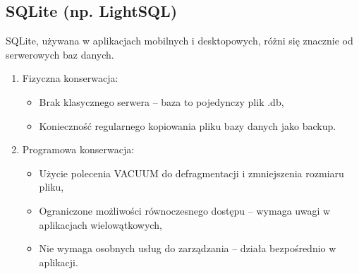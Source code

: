 \documentclass[a4paper,11pt,polish]{sphinxmanual}
\begin{document}
\subsection{SQLite (np. LightSQL)}
\label{\detokenize{Kontrola_i_konserwacja/kontrola_i_konserwacja:sqlite-np-lightsql}}
\sphinxAtStartPar
SQLite, używana w aplikacjach mobilnych i desktopowych, różni się znacznie od serwerowych baz danych.
\begin{enumerate}
%
\item {} 
\sphinxAtStartPar
Fizyczna konserwacja:
\begin{itemize}
\item {} 
\sphinxAtStartPar
Brak klasycznego serwera – baza to pojedynczy plik .db,

\item {} 
\sphinxAtStartPar
Konieczność regularnego kopiowania pliku bazy danych jako backup.

\end{itemize}

\item {} 
\sphinxAtStartPar
Programowa konserwacja:
\begin{itemize}
\item {} 
\sphinxAtStartPar
Użycie polecenia VACUUM do defragmentacji i zmniejszenia rozmiaru pliku,

\item {} 
\sphinxAtStartPar
Ograniczone możliwości równoczesnego dostępu – wymaga uwagi w aplikacjach wielowątkowych,

\item {} 
\sphinxAtStartPar
Nie wymaga osobnych usług do zarządzania – działa bezpośrednio w aplikacji.

\end{itemize}

\end{enumerate}
\end{document}
